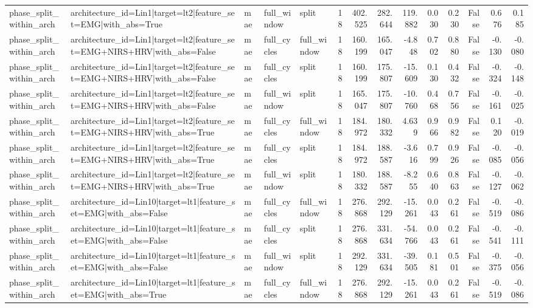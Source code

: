 \begin{table}
\begin{tabular}{lllllrrrrrrrrr}
phase_split_within_arch & architecture_id=Lin1|target=lt2|feature_set=EMG|with_abs=True & mae & full_window & split & 18 & 402.525 & 282.644 & 119.882 & 0.030 & 0.230 & False & 0.676 & 0.185 \\
phase_split_within_arch & architecture_id=Lin1|target=lt2|feature_set=EMG+NIRS+HRV|with_abs=False & mae & full_cycles & full_window & 18 & 160.199 & 165.047 & -4.848 & 0.702 & 0.880 & False & -0.130 & -0.080 \\
phase_split_within_arch & architecture_id=Lin1|target=lt2|feature_set=EMG+NIRS+HRV|with_abs=False & mae & full_cycles & split & 18 & 160.199 & 175.807 & -15.609 & 0.130 & 0.432 & False & -0.324 & -0.148 \\
phase_split_within_arch & architecture_id=Lin1|target=lt2|feature_set=EMG+NIRS+HRV|with_abs=False & mae & full_window & split & 18 & 165.047 & 175.807 & -10.760 & 0.468 & 0.756 & False & -0.161 & -0.025 \\
phase_split_within_arch & architecture_id=Lin1|target=lt2|feature_set=EMG+NIRS+HRV|with_abs=True & mae & full_cycles & full_window & 18 & 184.972 & 180.332 & 4.639 & 0.966 & 0.982 & False & 0.120 & -0.019 \\
phase_split_within_arch & architecture_id=Lin1|target=lt2|feature_set=EMG+NIRS+HRV|with_abs=True & mae & full_cycles & split & 18 & 184.972 & 188.587 & -3.616 & 0.799 & 0.926 & False & -0.085 & -0.056 \\
phase_split_within_arch & architecture_id=Lin1|target=lt2|feature_set=EMG+NIRS+HRV|with_abs=True & mae & full_window & split & 18 & 180.332 & 188.587 & -8.255 & 0.640 & 0.863 & False & -0.127 & -0.062 \\
phase_split_within_arch & architecture_id=Lin10|target=lt1|feature_set=EMG|with_abs=False & mae & full_cycles & full_window & 18 & 276.868 & 292.129 & -15.261 & 0.043 & 0.261 & False & -0.519 & -0.086 \\
phase_split_within_arch & architecture_id=Lin10|target=lt1|feature_set=EMG|with_abs=False & mae & full_cycles & split & 18 & 276.868 & 331.634 & -54.766 & 0.043 & 0.261 & False & -0.541 & -0.111 \\
phase_split_within_arch & architecture_id=Lin10|target=lt1|feature_set=EMG|with_abs=False & mae & full_window & split & 18 & 292.129 & 331.634 & -39.505 & 0.181 & 0.501 & False & -0.375 & -0.056 \\
phase_split_within_arch & architecture_id=Lin10|target=lt1|feature_set=EMG|with_abs=True & mae & full_cycles & full_window & 18 & 276.868 & 292.129 & -15.261 & 0.043 & 0.261 & False & -0.519 & -0.086 \\

\end{tabular}
\end{table}
